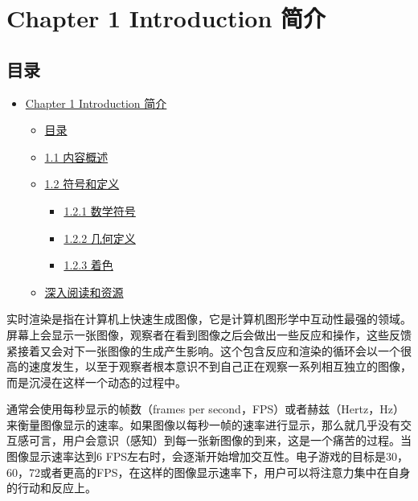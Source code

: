 \documentclass[
  paper=a4,
  ,captions=tableheading
]{scrartcl}
\author{}
\date{}
\title{}
\author{}
\date{}
\providecommand{\tightlist}{%
  \setlength{\itemsep}{0pt}\setlength{\parskip}{0pt}}
\begin{document}
\section{Chapter 1 Introduction
简介}\label{chapter-1-introduction-ux7b80ux4ecb}

\subsection{目录}\label{ux76eeux5f55}

\begin{itemize}
\tightlist
\item
  \hyperref[chapter-1-introduction-ux7b80ux4ecb]{Chapter 1 Introduction
  简介}

  \begin{itemize}
  \tightlist
  \item
    \hyperref[ux76eeux5f55]{目录}
  \item
    \hyperref[11-ux5185ux5bb9ux6982ux8ff0]{1.1 内容概述}
  \item
    \hyperref[12-ux7b26ux53f7ux548cux5b9aux4e49]{1.2 符号和定义}

    \begin{itemize}
    \tightlist
    \item
      \hyperref[121-ux6570ux5b66ux7b26ux53f7]{1.2.1 数学符号}
    \item
      \hyperref[122-ux51e0ux4f55ux5b9aux4e49]{1.2.2 几何定义}
    \item
      \hyperref[123-ux7740ux8272]{1.2.3 着色}
    \end{itemize}
  \item
    \hyperref[ux6df1ux5165ux9605ux8bfbux548cux8d44ux6e90]{深入阅读和资源}
  \end{itemize}
\end{itemize}

实时渲染是指在计算机上快速生成图像，它是计算机图形学中互动性最强的领域。屏幕上会显示一张图像，观察者在看到图像之后会做出一些反应和操作，这些反馈紧接着又会对下一张图像的生成产生影响。这个包含反应和渲染的循环会以一个很高的速度发生，以至于观察者根本意识不到自己正在观察一系列相互独立的图像，而是沉浸在这样一个动态的过程中。

通常会使用每秒显示的帧数（frames per
second，FPS）或者赫兹（Hertz，Hz）来衡量图像显示的速率。如果图像以每秒一帧的速率进行显示，那么就几乎没有交互感可言，用户会意识（感知）到每一张新图像的到来，这是一个痛苦的过程。当图像显示速率达到6
FPS左右时，会逐渐开始增加交互性。电子游戏的目标是30，60，72或者更高的FPS，在这样的图像显示速率下，用户可以将注意力集中在自身的行动和反应上。
\end{document}
